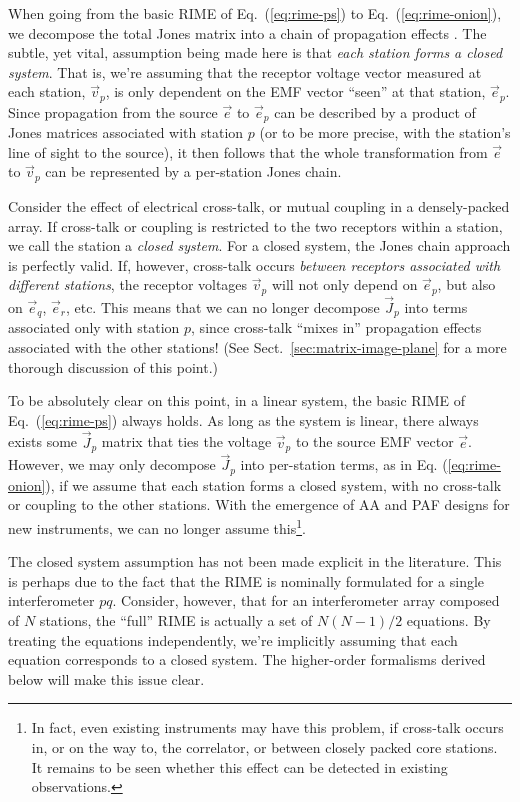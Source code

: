 \documentclass{aa}
\newcommand{\jones}[2]{\vec {#1}_{#2}}
\begin{document}
When going from the basic RIME of Eq.~(\ref{eq:rime-ps}) to Eq.~(\ref{eq:rime-onion}), we decompose the total Jones matrix into a chain of propagation effects \citep[see Paper I,][]{RRIME1}. The subtle, yet vital, assumption being made here is that  \emph{each station forms a closed system}. That is, we're assuming that the receptor voltage vector measured at each station, $\vec{v}_{p}$, is only dependent on the EMF vector ``seen'' at that station, $\vec e_{p}$. Since propagation from the source $\vec e$ to $\vec e_{p}$ can be described by a product of Jones matrices associated with station $p$ (or to be more precise, with the station's line of sight to the source), it then follows that the whole transformation from $\vec e$ to $\vec v_p$ can be represented by a per-station Jones chain.

Consider the effect of electrical cross-talk, or mutual coupling in a densely-packed array. If cross-talk or coupling is restricted to
the two receptors within a station, we call the station a \emph{closed system}. For a closed system, the Jones chain approach is perfectly valid. If, however, cross-talk occurs \emph{between receptors associated with different stations}, the receptor voltages $\vec{v}_{p}$ will
not only depend on $\vec e_{p}$, but also on $\vec e_{q}$, $\vec e_{r}$, etc. This means that we can no longer decompose
$\jones{J}{p}$ into terms associated only with station $p$, since cross-talk ``mixes in'' propagation effects
associated with the other stations! (See Sect.~\ref{sec:matrix-image-plane} for a more thorough discussion of this point.)

To be absolutely clear on this point, in a linear system, the basic RIME of Eq.~(\ref{eq:rime-ps}) always holds. As long as the system is
linear, there always exists some $\jones{J}{p}$ matrix that ties the voltage $\vec v_p$ to the source EMF vector $\vec e$. However, we may only decompose $\jones{J}{p}$ into per-station terms, as in Eq. (\ref{eq:rime-onion}), if we assume that each station forms a closed system, with no cross-talk or coupling to the other stations. With the emergence of AA and PAF designs for new instruments, we can no longer assume this\footnote{In fact, even existing instruments may have this problem, if cross-talk occurs in, or on the way to, the correlator, or between closely packed core stations. It remains to be seen
whether this effect can be detected in existing observations.}.%

The closed system assumption has not been made explicit in the literature. This is perhaps due to the fact that the RIME is nominally formulated for a single interferometer $pq$. Consider, however, that for an interferometer array composed of $N$ stations, the ``full'' RIME is actually a set of $N(N-1)/2$ equations. By treating the equations independently, we're implicitly assuming that each equation corresponds to a closed system. The higher-order 
formalisms derived below will make this issue clear.
\end{document}
